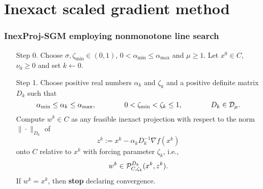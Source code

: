 \section{Inexact scaled gradient method}

\begingroup
\small
\begin{frame}[t]
  \frametitle{InexProj-SGM employing nonmonotone line search}

  \begin{enumerate}
    \item[Step 0.] Choose  $\sigma,{\zeta_{\min}}  \in (0, 1)$, $0 < \alpha_{\min} \leq \alpha_{\max}$ and $\mu \geq1$. Let $x^0\in C$, $\nu_0\geq 0$ and set $k\gets0$.

    \item[Step 1.] Choose positive real numbers $\alpha_k$ and $\zeta_k$ and a positive definite matrix $D_k$ such that
      \begin{equation*}
        \alpha_{\min}\leq \alpha_k \leq \alpha_{\max}, \qquad \qquad 0 <{\zeta_{\min}}<\zeta_k \leq 1, \qquad \qquad D_k\in {\cal D}_{\mu}.
      \end{equation*}
      Compute  $w^{k}\in C$  as any feasible inexact projection  with respect to the norm $\| \cdot \| _{D_k}$ of
      \[
        z^k := x^{k}-\alpha_k D_k^{-1}\nabla f(x^{k})
      \]
      onto $C$ relative to $x^{k}$  with forcing parameter $\zeta_k$, i.e.,
      \begin{equation*}
        w^k \in   {\cal P}_{C, \zeta_k}^{D_k}(x^{k}, z^k).
      \end{equation*}
      If $w^k= x^k$, then {\bf stop} declaring convergence.
  \end{enumerate}
\end{frame}
\endgroup


